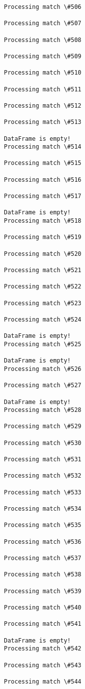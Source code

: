 \documentclass[11pt]{article}
\begin{document}
\begin{Verbatim}[commandchars=\\\{\}]
Processing match \#506

Processing match \#507

Processing match \#508

Processing match \#509

Processing match \#510

Processing match \#511

Processing match \#512

Processing match \#513

DataFrame is empty!
Processing match \#514

Processing match \#515

Processing match \#516

Processing match \#517

DataFrame is empty!
Processing match \#518

Processing match \#519

Processing match \#520

Processing match \#521

Processing match \#522

Processing match \#523

Processing match \#524

DataFrame is empty!
Processing match \#525

DataFrame is empty!
Processing match \#526

Processing match \#527

DataFrame is empty!
Processing match \#528

Processing match \#529

Processing match \#530

Processing match \#531

Processing match \#532

Processing match \#533

Processing match \#534

Processing match \#535

Processing match \#536

Processing match \#537

Processing match \#538

Processing match \#539

Processing match \#540

Processing match \#541

DataFrame is empty!
Processing match \#542

Processing match \#543

Processing match \#544


\end{Verbatim}
\end{document}
